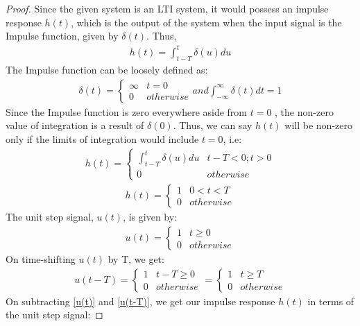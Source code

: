 \documentclass[journal,12pt,twocolumn]{IEEEtran}
\begin{document}
\begin{proof}
Since the given system is an LTI system, it would possess an impulse response $h(t)$, which is the output of the system when the input signal is the Impulse function, given by $\delta(t)$. Thus,
\begin{align}
    h(t) = \int_{t-T}^{t} \delta(u)du
\end{align}
The Impulse function can be loosely defined as:
\begin{align}
    \delta(t) = 
    \begin{cases}
\infty & t = 0\\
0 & otherwise
\end{cases}
and \int_{-\infty}^\infty \delta(t)dt  = 1
\end{align}
Since the Impulse function is zero everywhere aside from $t = 0$ , the non-zero value of integration is a result of $\delta(0)$. Thus, we can say $h(t)$ will be non-zero only if the limits of integration would include $t=0$, i.e:
\begin{align}
    h(t) = 
    \begin{cases}
    \int_{t-T}^{t} \delta(u)du & t-T<0 ; t>0\\
    0 & otherwise
    \end{cases}
    \end{align}
    \begin{align}
h(t) = 
    \begin{cases}
    1 & 0<t<T\\
    0 & otherwise
    \end{cases}
    \label{H}
\end{align}
The unit step signal, $u(t)$, is given by:
\begin{align}
    u(t) = 
    \begin{cases}
    1 & t\geq0\\
    0 & otherwise
    \end{cases}
    \label{u(t)}
\end{align}
On time-shifting $u(t)$ by T, we get:
\begin{align}
     u(t - T) = 
    \begin{cases}
    1 & t-T\geq 0\\
    0 & otherwise
    \end{cases}
    = 
    \begin{cases}
    1 & t\geq T\\
    0 & otherwise
    \end{cases}
    \label{u(t-T)}
\end{align}
On subtracting \eqref{u(t)} and \eqref{u(t-T)}, we get our impulse response $h(t)$ in terms of the unit step signal:

\end{proof}
\end{document}
